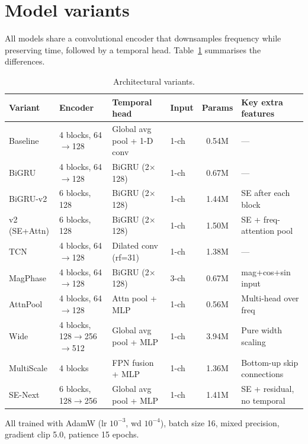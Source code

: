 \documentclass[11pt,a4paper]{article}
\begin{document}
\section{Model variants}

All models share a convolutional encoder that downsamples frequency while preserving time, followed by a temporal head. Table~\ref{tab:variants} summarises the differences.

\begin{table}[ht]
  \centering
  \caption{Architectural variants.}
  \label{tab:variants}
  \small
  \begin{tabular}{llllcp{3.5cm}}
    \toprule
    Variant & Encoder & Temporal head & Input & Params & Key extra features \\
    \midrule
    Baseline & 4 blocks, 64$\to$128 & Global avg pool + 1-D conv & 1-ch & 0.54M & --- \\
    BiGRU & 4 blocks, 64$\to$128 & BiGRU (2$\times$128) & 1-ch & 0.67M & --- \\
    BiGRU-v2 & 6 blocks, 128 & BiGRU (2$\times$128) & 1-ch & 1.44M & SE after each block \\
    v2 (SE+Attn) & 6 blocks, 128 & BiGRU (2$\times$128) & 1-ch & 1.50M & SE + freq-attention pool \\
    TCN & 4 blocks, 64$\to$128 & Dilated conv (rf=31) & 1-ch & 1.38M & --- \\
    MagPhase & 4 blocks, 64$\to$128 & BiGRU (2$\times$128) & 3-ch & 0.67M & mag+cos+sin input \\
    AttnPool & 4 blocks, 64$\to$128 & Attn pool + MLP & 1-ch & 0.56M & Multi-head over freq \\
    Wide & 4 blocks, 128$\to$256$\to$512 & Global avg pool + MLP & 1-ch & 3.94M & Pure width scaling \\
    MultiScale & 4 blocks & FPN fusion + MLP & 1-ch & 1.36M & Bottom-up skip connections \\
    SE-Next & 6 blocks, 128$\to$256 & Global avg pool + MLP & 1-ch & 1.41M & SE + residual, no temporal \\
    \bottomrule
  \end{tabular}
\end{table}

All trained with AdamW (lr $10^{-3}$, wd $10^{-4}$), batch size 16, mixed precision, gradient clip 5.0, patience 15 epochs.
\end{document}
